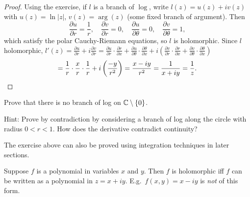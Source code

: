 \documentclass[11pt]{article}
\begin{document}
\begin{proof}
Using the exercise, if $l$ is a branch of $\log$, write $l(z) = u(z) + iv(z)$ with $u(z) = \ln|z|$, $v(z) = \arg(z)$ (some fixed branch of argument). Then
\[
\frac{\partial u}{\partial r} = \frac{1}{r}, \quad \frac{\partial v}{\partial r} = 0, \quad \frac{\partial u}{\partial \theta} = 0, \quad \frac{\partial v}{\partial \theta} = 1,
\]
which satisfy the polar Cauchy-Riemann equations, so $l$ is holomorphic.
Since $l$ holomorphic, $l'(z) = \frac{\partial u}{\partial r} + i\frac{\partial v}{\partial r} = \frac{\partial u}{\partial r}\cdot\frac{\partial r}{\partial x} + \frac{\partial u}{\partial \theta}\cdot \frac{\partial \theta}{\partial x} + i\left(\frac{\partial v}{\partial r}\cdot\frac{\partial r}{\partial x} + \frac{\partial v}{\partial \theta}\cdot\frac{\partial \theta}{\partial x}\right)$
\[
= \frac{1}{r}\cdot \frac{x}{r}\cdot\frac{1}{r} + i\left(\frac{-y}{r^2}\right) = \frac{x-iy}{r^2} = \frac{1}{x+iy} = \frac{1}{z}. \qedhere
\]
\end{proof}

\begin{exercise}
    Prove that there is no branch of log on ${\mathbb{C}} \setminus \{0\}$. 
    
    Hint: Prove by contradiction by considering a branch of log along the circle with radius $0<r<1$. How does the derivative contradict continuity?
\end{exercise}

The exercise above can also be proved using integration techniques in later sections.

\begin{theorem}
Suppose $f$ is a polynomial in variables $x$ and $y$. Then $f$ is holomorphic iff $f$ can be written as a polynomial in $z = x+iy$. E.g.\ $f(x,y) = x-iy$ is \emph{not} of this form.
\end{theorem}
\end{document}
